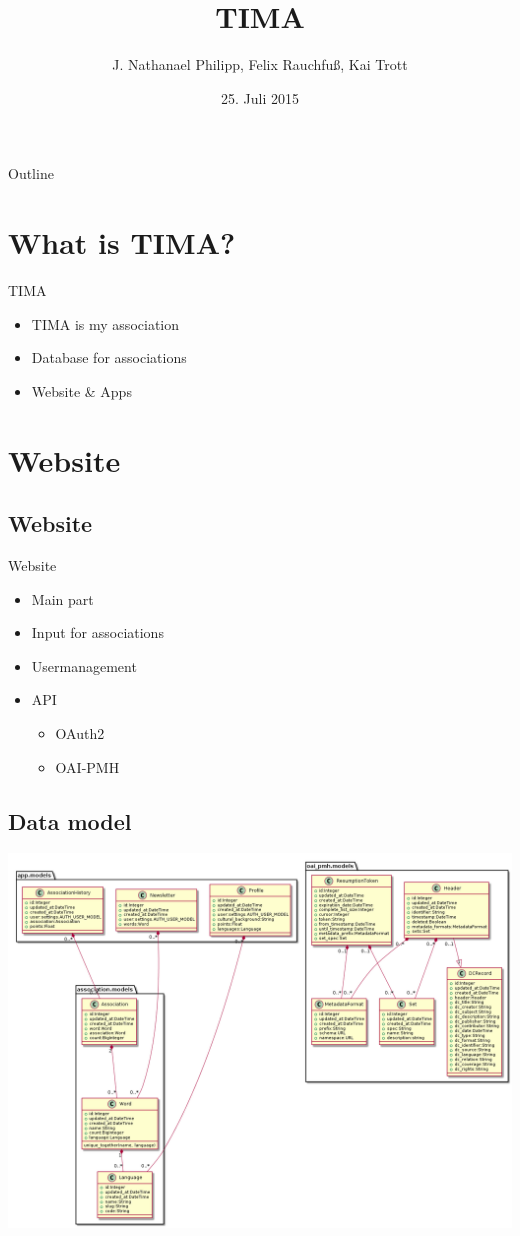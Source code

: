 \documentclass[11pt, a4paper]{beamer}
\author{J. Nathanael Philipp, Felix Rauchfuß, Kai Trott}
\title{TIMA}
\date{25. Juli 2015}
\institute{Universität Leipzig}
\begin{document}
\section{}
\begin{frame}
\titlepage
\end{frame}

\begin{frame}{Outline}
	\tableofcontents
\end{frame}

\section{What is TIMA?}
\begin{frame}{TIMA}
	\begin{itemize}
		\item TIMA is my association
		\item Database for associations
		\item Website \& Apps
	\end{itemize}
\end{frame}

\section{Website}
\subsection{Website}
\begin{frame}{Website}
	\begin{itemize}
		\item Main part
		\item Input for associations
		\item Usermanagement
		\item API
		\begin{itemize}
			\item OAuth2
			\item OAI-PMH
		\end{itemize}
	\end{itemize}
\end{frame}

\subsection{Data model}
\begin{frame}
	\begin{center}
		\includegraphics[width=\textwidth]{uml.png}
	\end{center}
\end{frame}
\end{document}
